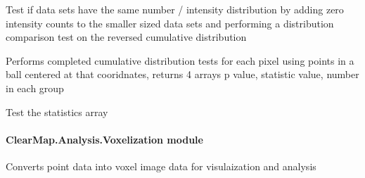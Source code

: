 \documentclass[letterpaper,10pt,english]{sphinxmanual}
\begin{document}

\begin{fulllineitems}
\label{api/ClearMap.Analysis:ClearMap.Analysis.Statistics.testCompletedInvertedCumulatives}
Test if data sets have the same number / intensity distribution by adding zero intensity counts to the smaller sized data sets and performing a distribution comparison test on the reversed cumulative distribution

\end{fulllineitems}


\begin{fulllineitems}
\label{api/ClearMap.Analysis:ClearMap.Analysis.Statistics.testCompletedCumulativesInSpheres}
Performs completed cumulative distribution tests for each pixel using points in a ball centered at that cooridnates, returns 4 arrays p value, statistic value, number in each group

\end{fulllineitems}


\begin{fulllineitems}
\label{api/ClearMap.Analysis:ClearMap.Analysis.Statistics.test}
Test the statistics array

\end{fulllineitems}



\paragraph{ClearMap.Analysis.Voxelization module}
\label{api/ClearMap.Analysis:clearmap-analysis-voxelization-module}\label{api/ClearMap.Analysis:module-ClearMap.Analysis.Voxelization}
Converts point data into voxel image data for visulaization and analysis
\end{document}
